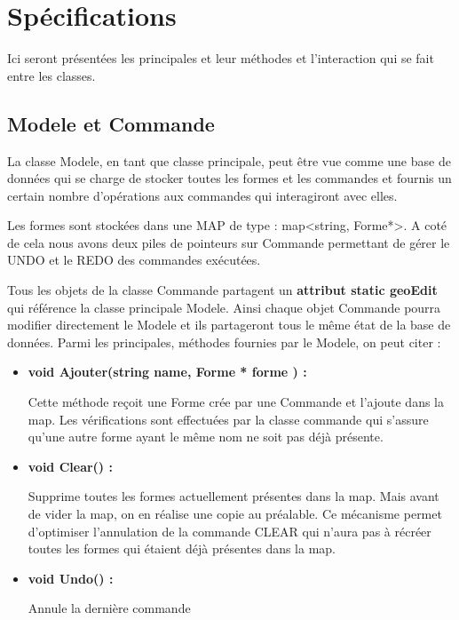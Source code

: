 \documentclass[12pt]{article}
\begin{document}
\section{Spécifications}
Ici seront présentées les principales et leur méthodes et l’interaction qui se fait entre les classes.
\subsection{Modele et Commande}
La classe Modele, en tant que classe principale, peut être vue comme une base de données qui se charge de stocker toutes les formes et les commandes et fournis un certain nombre d’opérations aux commandes qui interagiront avec elles. 

Les formes sont stockées dans une MAP de type : map<string, Forme*>. A coté de cela nous avons deux piles de pointeurs sur Commande permettant de gérer le UNDO et le REDO des commandes exécutées.
 
Tous les objets de la classe Commande partagent un \textbf{attribut static geoEdit} qui référence la classe principale Modele. Ainsi chaque objet Commande pourra modifier directement le Modele et ils partageront tous le même état de la base de données. Parmi les principales, méthodes fournies par le Modele, on peut citer :
\newline
\begin{itemize}
\item \textbf{void Ajouter(string name, Forme * forme ) :}

Cette méthode reçoit une Forme crée par une Commande et l’ajoute dans la map. Les vérifications sont effectuées par la classe commande qui s’assure qu’une autre forme ayant le même nom ne soit pas déjà présente.

\item \textbf{void Clear() :}

Supprime toutes les formes actuellement présentes dans la map. Mais avant de vider la map, on en réalise une copie au préalable. Ce mécanisme permet d’optimiser l’annulation de la commande CLEAR qui n’aura pas à récréer toutes les formes qui étaient déjà présentes dans la map.

\item  \textbf{void Undo() :}

Annule la dernière commande
\end{itemize}
\end{document}
